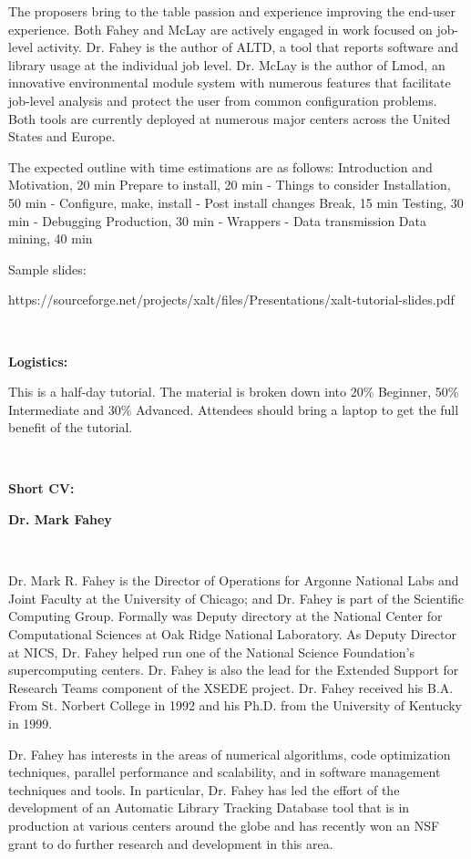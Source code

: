 \documentclass[12pt]{article}
\begin{document}
The proposers bring to the table passion and experience improving the
end-user experience. Both Fahey and McLay are actively engaged in work
focused on job-level activity. Dr. Fahey is the author of ALTD, a tool
that reports software and library usage at the individual job
level. Dr. McLay is the author of Lmod, an innovative environmental
module system with numerous features that facilitate job-level
analysis and protect the user from common configuration problems. Both
tools are currently deployed at numerous major centers across the
United States and Europe. 

The expected outline with time estimations are as follows:
Introduction and Motivation, 20 min Prepare to install, 20 min -
Things to consider Installation, 50 min - Configure, make, install -
Post install changes Break, 15 min Testing, 30 min - Debugging
Production, 30 min - Wrappers - Data transmission Data mining, 40 min 

\noindent
Sample slides:

https://sourceforge.net/projects/xalt/files/Presentations/xalt-tutorial-slides.pdf 

~~

\noindent
{\bf{}Logistics:}

This is a half-day tutorial.  The material is broken down into 20\%
Beginner, 50\% Intermediate and 30\% Advanced.   Attendees should
bring a laptop to get the full benefit of the tutorial.

~~

\noindent
{\bf{}Short CV:} 

\noindent
{\bf{}Dr. Mark Fahey}

~~

\noindent
Dr. Mark R. Fahey is the Director of Operations for Argonne National
Labs and Joint Faculty at the University of Chicago; and Dr. Fahey is
part of the Scientific Computing Group. Formally was Deputy directory 
at the National Center for Computational Sciences at Oak Ridge
National Laboratory.  As Deputy Director at NICS, Dr. Fahey helped run one of
the National Science Foundation’s supercomputing centers.  Dr. Fahey
is also the lead for the Extended Support for Research Teams component
of the XSEDE project.  Dr. Fahey received his B.A. From St. Norbert
College in 1992 and his Ph.D. from the University of Kentucky in 1999.  

Dr. Fahey has interests in the areas of numerical algorithms, code
optimization techniques, parallel performance and scalability, and in
software management techniques and tools.  In particular, Dr. Fahey
has led the effort of the development of an Automatic Library Tracking
Database tool that is in production at various centers around the
globe and has recently won an NSF grant to do further research and
development in this area. 
\end{document}
